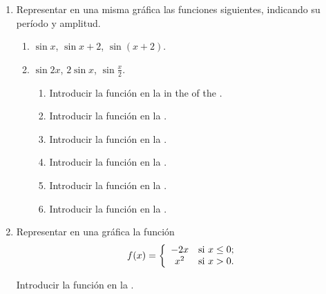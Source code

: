 \begin{enumerate}[leftmargin=*]
\item Representar en una misma gráfica las funciones siguientes, indicando su período y amplitud.
      \begin{enumerate}
      \item $\sin{x}$, $\sin{x}+2$, $\sin{(x+2)}$.
      \item $\sin{2x}$, $2\sin{x}$, $\sin\frac{x}{2}$.
            \begin{indication}
            \begin{enumerate}
            \item Introducir la función  en la in the  of the .
            \item Introducir la función  en la .
            \item Introducir la función  en la .
            \item Introducir la función  en la .
            \item Introducir la función  en la .
            \item Introducir la función  en la .
            \end{enumerate}
            \end{indication}
      \end{enumerate}


\item Representar en una gráfica la función
      \[
      \ f(x)=\left\{
      \begin{array}{cl}
      -2x   & \hbox{si $x\leq0$;} \\
      x^{2} & \hbox{si $x>0$.}    \\
      \end{array}
      \right.
      \]

      \begin{indication}
      Introducir la función  en la .
      \end{indication}
\end{enumerate}


